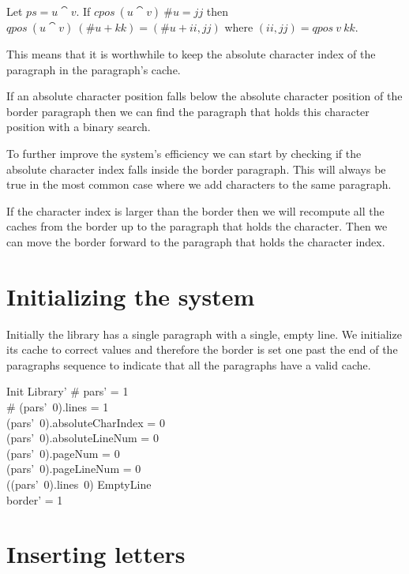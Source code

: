 \documentclass{article}
\begin{document}
Let $ps = u \cat v$. If $cpos~(u\cat v)~\#u = jj$ then $qpos~(u\cat v)~(\#u+kk) = (\#u + ii, jj)$ where $(ii, jj) = qpos~v~kk$. 

This means that it is worthwhile to keep the absolute character index of the paragraph in the paragraph's cache. 

If an absolute character position falls below the absolute character position of the border paragraph then we can find the paragraph that holds this character position with a binary search. 



To further improve the system's efficiency we can start by checking if the absolute character index falls inside the border paragraph. This will always be true in the most common case where we add characters to the same paragraph. 

If the character index is larger than the border then we will recompute all the caches from the border up to the paragraph that holds the character. Then we can move the border forward to the paragraph that holds the character index.

\section{Initializing the system}

Initially the library has a single paragraph with a single, empty line. We initialize its cache to correct values and therefore the border is set one past the end of the paragraphs sequence to indicate that all the paragraphs have a valid cache.

\begin{schema}{Init}
	Library'
\where
	\# pars' = 1 \\
	\# (pars'~0).lines = 1 \\
	(pars'~0).absoluteCharIndex = 0 \\
	(pars'~0).absoluteLineNum = 0 \\
	(pars'~0).pageNum = 0 \\
	(pars'~0).pageLineNum = 0 \\
	((pars'~0).lines~0) \in EmptyLine \\
	border' = 1 \\
\end{schema}

\section{Inserting letters}
\end{document}
